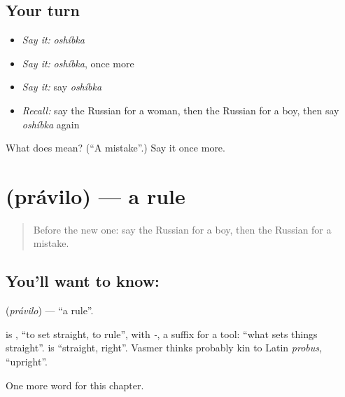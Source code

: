 \subsection*{Your turn}
\begin{itemize}
\raggedright
  \item \emph{Say it:} \emph{oshíbka}
  \item \emph{Say it:} \emph{oshíbka}, once more
  \item \emph{Say it:} say \emph{oshíbka}
  \item \emph{Recall:} say the Russian for a woman, then the Russian for a boy, then say \emph{oshíbka} again
\end{itemize}

\begin{tcolorbox}[breakable,colback=teal!4,colframe=teal!35!black,title={Before you move on}]
What does  mean? (\textquotedblleft{}A mistake\textquotedblright{}.) Say it once more.
\end{tcolorbox}
\section[\texorpdfstring{\ru{правило} (právilo)}{правило (právilo)}]{ (právilo) — a rule}

\label{lesson:RU-C228-pravilo}



\begin{quote}
Before the new one: say the Russian for a boy, then the Russian for a mistake.
\end{quote}

\subsection*{You'll want to know: }
\textbf{} (\emph{právilo}) — \textquotedblleft{}a rule\textquotedblright{}.

\begin{cousinweb}
\textbf{} is \emph{}, \textquotedblleft{}to set straight, to rule\textquotedblright{}, with \emph{-}, a suffix for a tool: \textquotedblleft{}what sets things straight\textquotedblright{}. \emph{} is \textquotedblleft{}straight, right\textquotedblright{}. Vasmer thinks \emph{} probably kin to Latin \emph{probus}, \textquotedblleft{}upright\textquotedblright{}.
\end{cousinweb}

\begin{grammarlens}[title={What you've built}]
One more word for this chapter.
\end{grammarlens}


